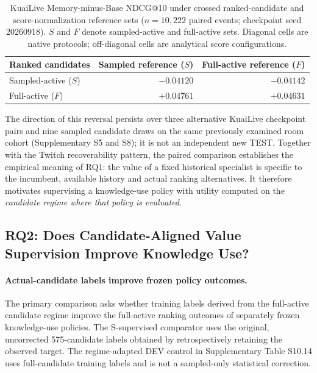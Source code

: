 \begin{table}[!htbp]
\centering
\caption{KuaiLive Memory-minus-Base NDCG@10 under crossed ranked-candidate and score-normalization reference sets ($n=10{,}222$ paired events; checkpoint seed 20260918). $S$ and $F$ denote sampled-active and full-active sets. Diagonal cells are native protocols; off-diagonal cells are analytical score configurations.}
\label{tab:results-factorial}
\footnotesize
\setlength{\tabcolsep}{6pt}
\begin{tabular}{@{}lrr@{}}
\toprule
Ranked candidates & Sampled reference ($S$) & Full-active reference ($F$) \\
\midrule
Sampled-active ($S$) & $-0.04120$ & $-0.04142$ \\
Full-active ($F$) & $+0.04761$ & $+0.04631$ \\
\bottomrule
\end{tabular}
\end{table}

The direction of this reversal persists over three alternative KuaiLive checkpoint pairs and nine sampled candidate draws on the same previously examined room cohort (Supplementary S5 and S8); it is not an independent new TEST. Together with the Twitch recoverability pattern, the paired comparison establishes the empirical meaning of RQ1: the value of a fixed historical specialist is specific to the incumbent, available history and actual ranking alternatives. It therefore motivates supervising a knowledge-use policy with utility computed on the \emph{candidate regime where that policy is evaluated}.

\FloatBarrier
\subsection{RQ2: Does Candidate-Aligned Value Supervision Improve Knowledge Use?}
\label{sec:results-decision}

\paragraph{Actual-candidate labels improve frozen policy outcomes.}
The primary comparison asks whether training labels derived from the full-active candidate regime improve the full-active ranking outcomes of separately frozen knowledge-use policies. The S-supervised comparator uses the original, uncorrected 575-candidate labels obtained by retrospectively retaining the observed target. The regime-adapted DEV control in Supplementary Table S10.14 uses full-candidate training labels and is not a sampled-only statistical correction.

